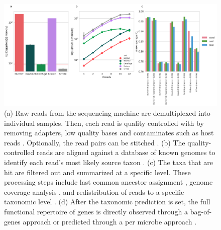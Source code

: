 \documentclass[conference,11pt]{IEEEtran}
\begin{document}
\begin{figure}[hbt]
    \centering
    \includegraphics[width=0.8\linewidth]{fig/simulations.png}
    \caption{(a) Raw reads from the sequencing machine are demultiplexed into individual samples. Then, each read is quality controlled with by removing adapters, low quality bases and contaminates such as host reads \cite{consortium_structure_2012}. Optionally, the read pairs can be stitched \cite{magoc_flash:_2011}. (b) The quality-controlled reads are aligned against a database of known genomes to identify each read's most likely source taxon \cite{langmead_fast_2012}. (c) The taxa that are hit are filtered out and summarized at a specific level. These processing steps include last common ancestor assignment \cite{hong_pathoscope_2014}, genome coverage analysis \cite{wood_kraken:_2014}, and redistribution of reads to a specific taxonomic level \cite{lu_bracken:_2017}. (d) After the taxonomic prediction is set, the full functional repertoire of genes is directly observed through a bag-of-genes approach or predicted through a per microbe approach \cite{langille_predictive_2013}.}
      \label{fig:simulations}
\end{figure}
\end{document}

